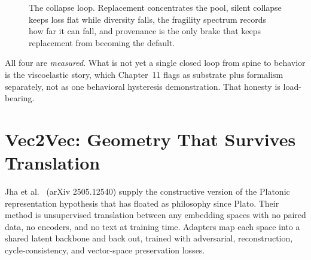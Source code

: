 \begin{figure}[h]
\centering
{}
\caption{The collapse loop. Replacement concentrates the pool, silent collapse keeps loss flat while diversity falls, the fragility spectrum records how far it can fall, and provenance is the only brake that keeps replacement from becoming the default.}
\label{fig:ch09-collapse}
\end{figure}

All four are \textit{measured}. What is not yet a single closed loop from spine to behavior is the viscoelastic story, which Chapter~11 flags as substrate plus formalism separately, not as one behavioral hysteresis demonstration. That honesty is load-bearing.

\section{Vec2Vec: Geometry That Survives Translation}
\label{sec:ch09-vec2vec}

Jha et al.\ \cite{jha2025} (arXiv 2505.12540) supply the constructive version of the Platonic representation hypothesis that has floated as philosophy since Plato. Their method is unsupervised translation between any embedding spaces with no paired data, no encoders, and no text at training time. Adapters map each space into a shared latent backbone and back out, trained with adversarial, reconstruction, cycle-consistency, and vector-space preservation losses.

